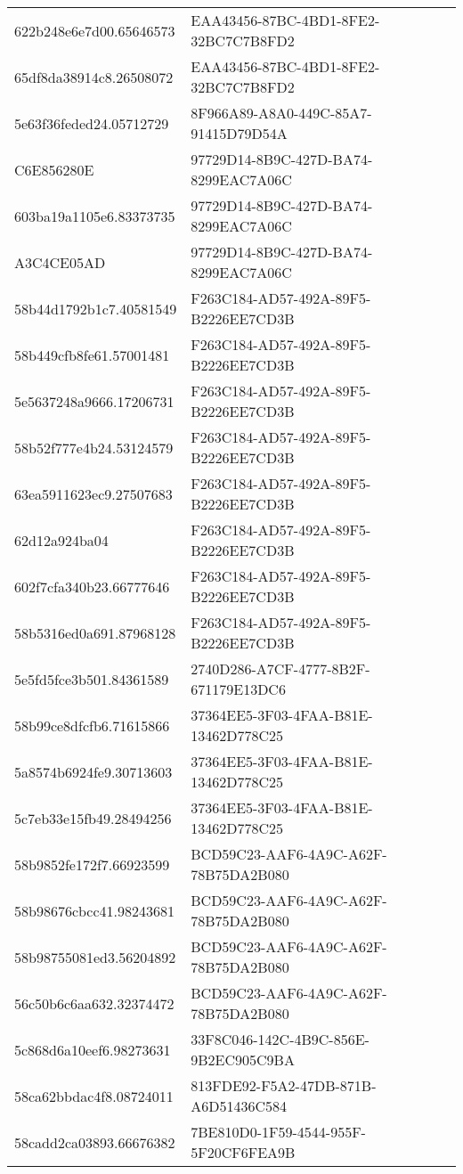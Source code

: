 \begin{tabular}{ll}
622b248e6e7d00.65646573 & EAA43456-87BC-4BD1-8FE2-32BC7C7B8FD2 \\
65df8da38914c8.26508072 & EAA43456-87BC-4BD1-8FE2-32BC7C7B8FD2 \\
5e63f36feded24.05712729 & 8F966A89-A8A0-449C-85A7-91415D79D54A \\
C6E856280E & 97729D14-8B9C-427D-BA74-8299EAC7A06C \\
603ba19a1105e6.83373735 & 97729D14-8B9C-427D-BA74-8299EAC7A06C \\
A3C4CE05AD & 97729D14-8B9C-427D-BA74-8299EAC7A06C \\
58b44d1792b1c7.40581549 & F263C184-AD57-492A-89F5-B2226EE7CD3B \\
58b449cfb8fe61.57001481 & F263C184-AD57-492A-89F5-B2226EE7CD3B \\
5e5637248a9666.17206731 & F263C184-AD57-492A-89F5-B2226EE7CD3B \\
58b52f777e4b24.53124579 & F263C184-AD57-492A-89F5-B2226EE7CD3B \\
63ea5911623ec9.27507683 & F263C184-AD57-492A-89F5-B2226EE7CD3B \\
62d12a924ba04 & F263C184-AD57-492A-89F5-B2226EE7CD3B \\
602f7cfa340b23.66777646 & F263C184-AD57-492A-89F5-B2226EE7CD3B \\
58b5316ed0a691.87968128 & F263C184-AD57-492A-89F5-B2226EE7CD3B \\
5e5fd5fce3b501.84361589 & 2740D286-A7CF-4777-8B2F-671179E13DC6 \\
58b99ce8dfcfb6.71615866 & 37364EE5-3F03-4FAA-B81E-13462D778C25 \\
5a8574b6924fe9.30713603 & 37364EE5-3F03-4FAA-B81E-13462D778C25 \\
5c7eb33e15fb49.28494256 & 37364EE5-3F03-4FAA-B81E-13462D778C25 \\
58b9852fe172f7.66923599 & BCD59C23-AAF6-4A9C-A62F-78B75DA2B080 \\
58b98676cbcc41.98243681 & BCD59C23-AAF6-4A9C-A62F-78B75DA2B080 \\
58b98755081ed3.56204892 & BCD59C23-AAF6-4A9C-A62F-78B75DA2B080 \\
56c50b6c6aa632.32374472 & BCD59C23-AAF6-4A9C-A62F-78B75DA2B080 \\
5c868d6a10eef6.98273631 & 33F8C046-142C-4B9C-856E-9B2EC905C9BA \\
58ca62bbdac4f8.08724011 & 813FDE92-F5A2-47DB-871B-A6D51436C584 \\
58cadd2ca03893.66676382 & 7BE810D0-1F59-4544-955F-5F20CF6FEA9B \\

\end{tabular}
